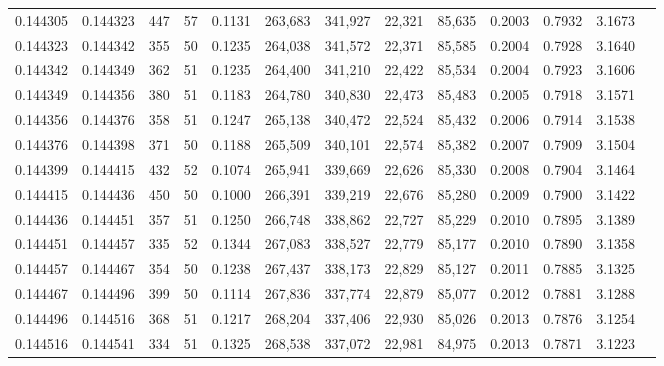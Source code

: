 \begin{tabular}{rrrrrrrrrrrrr}
0.144305 & 0.144323 &   447 &  57 &                                     0.1131 & 263,683 & 341,927 &  22,321 &  85,635 & 0.2003 & 0.7932 & 3.1673 \\
0.144323 & 0.144342 &   355 &  50 &                                     0.1235 & 264,038 & 341,572 &  22,371 &  85,585 & 0.2004 & 0.7928 & 3.1640 \\
0.144342 & 0.144349 &   362 &  51 &                                     0.1235 & 264,400 & 341,210 &  22,422 &  85,534 & 0.2004 & 0.7923 & 3.1606 \\
0.144349 & 0.144356 &   380 &  51 &                                     0.1183 & 264,780 & 340,830 &  22,473 &  85,483 & 0.2005 & 0.7918 & 3.1571 \\
0.144356 & 0.144376 &   358 &  51 &                                     0.1247 & 265,138 & 340,472 &  22,524 &  85,432 & 0.2006 & 0.7914 & 3.1538 \\
0.144376 & 0.144398 &   371 &  50 &                                     0.1188 & 265,509 & 340,101 &  22,574 &  85,382 & 0.2007 & 0.7909 & 3.1504 \\
0.144399 & 0.144415 &   432 &  52 &                                     0.1074 & 265,941 & 339,669 &  22,626 &  85,330 & 0.2008 & 0.7904 & 3.1464 \\
0.144415 & 0.144436 &   450 &  50 &                                     0.1000 & 266,391 & 339,219 &  22,676 &  85,280 & 0.2009 & 0.7900 & 3.1422 \\
0.144436 & 0.144451 &   357 &  51 &                                     0.1250 & 266,748 & 338,862 &  22,727 &  85,229 & 0.2010 & 0.7895 & 3.1389 \\
0.144451 & 0.144457 &   335 &  52 &                                     0.1344 & 267,083 & 338,527 &  22,779 &  85,177 & 0.2010 & 0.7890 & 3.1358 \\
0.144457 & 0.144467 &   354 &  50 &                                     0.1238 & 267,437 & 338,173 &  22,829 &  85,127 & 0.2011 & 0.7885 & 3.1325 \\
0.144467 & 0.144496 &   399 &  50 &                                     0.1114 & 267,836 & 337,774 &  22,879 &  85,077 & 0.2012 & 0.7881 & 3.1288 \\
0.144496 & 0.144516 &   368 &  51 &                                     0.1217 & 268,204 & 337,406 &  22,930 &  85,026 & 0.2013 & 0.7876 & 3.1254 \\
0.144516 & 0.144541 &   334 &  51 &                                     0.1325 & 268,538 & 337,072 &  22,981 &  84,975 & 0.2013 & 0.7871 & 3.1223 \\

\end{tabular}
